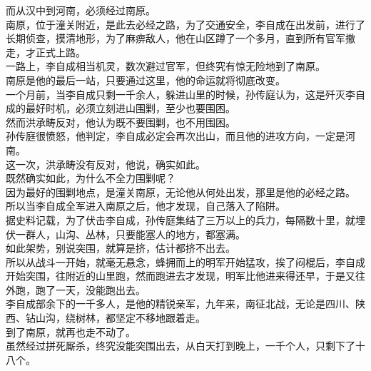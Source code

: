 \begin{multicols}{\theparacolNo}
而从汉中到河南，必须经过南原。\\

南原，位于潼关附近，是此去必经之路，为了交通安全，李自成在出发前，进行了长期侦查，摸清地形，为了麻痹敌人，他在山区蹲了一个多月，直到所有官军撤走，才正式上路。\\

一路上，李自成相当机灵，数次避过官军，但终究有惊无险地到了南原。\\

南原是他的最后一站，只要通过这里，他的命运就将彻底改变。\\

一个月前，当李自成只剩一千余人，躲进山里的时候，孙传庭认为，这是歼灭李自成的最好时机，必须立刻进山围剿，至少也要围困。\\

然而洪承畴反对，他认为既不要围剿，也不用围困。\\

孙传庭很愤怒，他判定，李自成必定会再次出山，而且他的进攻方向，一定是河南。\\

这一次，洪承畴没有反对，他说，确实如此。\\

既然确实如此，为什么不全力围剿呢？\\

因为最好的围剿地点，是潼关南原，无论他从何处出发，那里是他的必经之路。\\

所以当李自成全军进入南原之后，他才发现，自己落入了陷阱。\\

据史料记载，为了伏击李自成，孙传庭集结了三万以上的兵力，每隔数十里，就埋伏一群人，山沟、丛林，只要能塞人的地方，都塞满。\\

如此架势，别说突围，就算是挤，估计都挤不出去。\\

所以从战斗一开始，就毫无悬念，蜂拥而上的明军开始猛攻，挨了闷棍后，李自成开始突围，往附近的山里跑，然而跑进去才发现，明军比他进来得还早，于是又往外跑，跑了一天，没能跑出去。\\

李自成部余下的一千多人，是他的精锐亲军，九年来，南征北战，无论是四川、陕西、钻山沟，绕树林，都坚定不移地跟着走。\\

到了南原，就再也走不动了。\\

虽然经过拼死厮杀，终究没能突围出去，从白天打到晚上，一千个人，只剩下了十八个。\\


\end{multicols}
